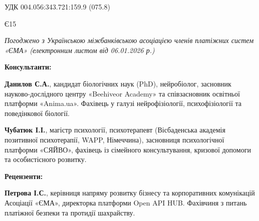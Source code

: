 ﻿\begin{titlepage}
\thispagestyle{empty}
{\small УДК 004.056:343.721:159.9 (075.8)} \par
{\small \hspace*{2em} Є15} \par


\vspace{3mm}
{\footnotesize \itshape Погоджено з Українською міжбанківською асоціацією членів платіжних систем «ЄМА» (електронним листом від 06.01.2026 р.)} \par

\vspace{3mm}
\textbf{Консультанти:} \par

{\small \textbf{Данилов С.А.}, кандидат біологічних наук (PhD), нейробіолог, засновник науково-дослідного центру «Beehiveor Academy» та співзасновник освітньої платформи «Anima.ua». Фахівець у галузі нейрофізіології, психофізіології та поведінкової біології.} \par


{\small \textbf{Чубатюк І.І.}, магістр психології, психотерапевт (Вісбаденська академія позитивної психотерапії, WAPP, Німеччина), засновниця психологічної платформи «СЯЙВО», фахівець із сімейного консультування, кризової допомоги та особистісного розвитку.} \par


\vspace{3mm}
\textbf{Рецензенти:} \par
{\small \textbf{Петрова І.С.}, керівниця напряму розвитку бізнесу та корпоративних комунікацій Асоціації «ЄМА», директорка платформи Open API HUB. Фахівчиня з питань платіжної безпеки та протидії шахрайству.} \par


\end{titlepage}
